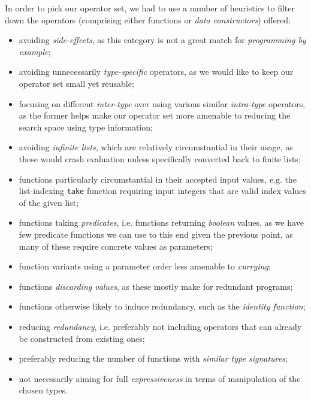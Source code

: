 \documentclass{article}
\begin{document}
In order to pick our operator set, %
we had to use a number of heuristics to filter down the operators (comprising either functions or \emph{data constructors}) offered:
\begin{itemize}
    \item avoiding \emph{side-effects},
    as this category is not a great match for \emph{programming by example};
    \item avoiding unnecessarily \emph{type-specific} operators, as we would like to keep our operator set small yet reusable;
    \item focusing on different \emph{inter-type} over using various similar \emph{intra-type} operators, as the former helps make our operator set more amenable to reducing the search space using type information;
    \item avoiding \emph{infinite lists}, which are relatively circumstantial in their usage, as these would crash evaluation unless specifically converted back to finite lists;
    \item functions particularly circumstantial in their accepted input values,
    e.g. the list-indexing \verb|take| function requiring input integers that are valid index values of the given list;
    \item functions taking \emph{predicates}, i.e. functions returning \emph{boolean} values, as we have few predicate functions we can use to this end given the previous point, as many of these require concrete values as parameters;
    \item function variants using a parameter order less amenable to \emph{currying};
    \item functions \emph{discarding values}, as these mostly make for redundant programs;
    \item
    functions otherwise likely to induce redundancy, such as the \emph{identity function};
    \item reducing \emph{redundancy}, i.e. preferably not including operators that can already be constructed from existing ones;
    \item preferably reducing the number of functions with \emph{similar type signatures};
    \item not necessarily aiming for full \emph{expressiveness} in terms of manipulation of the chosen types.
\end{itemize}
\end{document}
